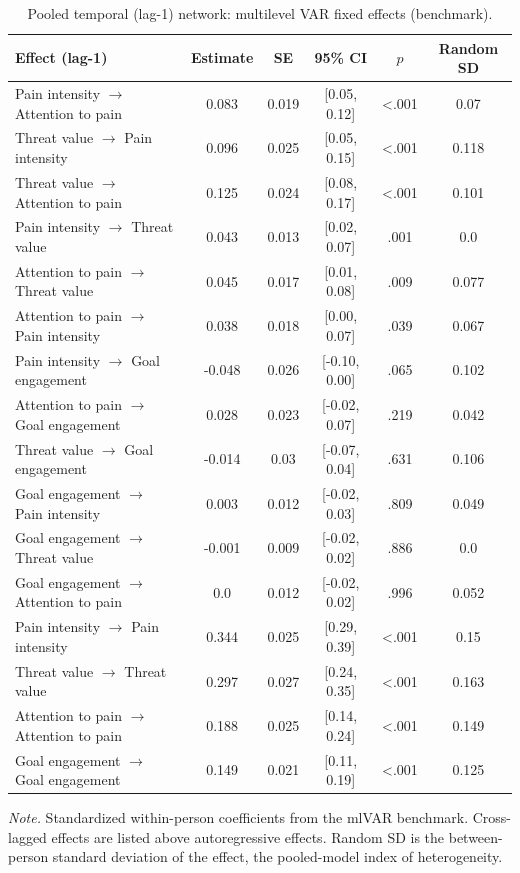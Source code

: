 \begin{table}[!htbp]
\raggedright
\caption{Pooled temporal (lag-1) network: multilevel VAR fixed effects (benchmark).}
\label{tab:temporal}
\footnotesize
\begingroup
\setlength{\tabcolsep}{4pt}
\renewcommand{\arraystretch}{1.08}
\noindent
\begin{tabular*}{\textwidth}{@{\extracolsep{\fill}}lccccc@{}}
\toprule
Effect (lag-1) & Estimate & SE & 95\% CI & $p$ & Random SD \\
\midrule
Pain intensity $\rightarrow$ Attention to pain & 0.083 & 0.019 & [0.05, 0.12] & <.001 & 0.07 \\
Threat value $\rightarrow$ Pain intensity & 0.096 & 0.025 & [0.05, 0.15] & <.001 & 0.118 \\
Threat value $\rightarrow$ Attention to pain & 0.125 & 0.024 & [0.08, 0.17] & <.001 & 0.101 \\
Pain intensity $\rightarrow$ Threat value & 0.043 & 0.013 & [0.02, 0.07] & .001 & 0.0 \\
Attention to pain $\rightarrow$ Threat value & 0.045 & 0.017 & [0.01, 0.08] & .009 & 0.077 \\
Attention to pain $\rightarrow$ Pain intensity & 0.038 & 0.018 & [0.00, 0.07] & .039 & 0.067 \\
Pain intensity $\rightarrow$ Goal engagement & -0.048 & 0.026 & [-0.10, 0.00] & .065 & 0.102 \\
Attention to pain $\rightarrow$ Goal engagement & 0.028 & 0.023 & [-0.02, 0.07] & .219 & 0.042 \\
Threat value $\rightarrow$ Goal engagement & -0.014 & 0.03 & [-0.07, 0.04] & .631 & 0.106 \\
Goal engagement $\rightarrow$ Pain intensity & 0.003 & 0.012 & [-0.02, 0.03] & .809 & 0.049 \\
Goal engagement $\rightarrow$ Threat value & -0.001 & 0.009 & [-0.02, 0.02] & .886 & 0.0 \\
Goal engagement $\rightarrow$ Attention to pain & 0.0 & 0.012 & [-0.02, 0.02] & .996 & 0.052 \\
Pain intensity $\rightarrow$ Pain intensity & 0.344 & 0.025 & [0.29, 0.39] & <.001 & 0.15 \\
Threat value $\rightarrow$ Threat value & 0.297 & 0.027 & [0.24, 0.35] & <.001 & 0.163 \\
Attention to pain $\rightarrow$ Attention to pain & 0.188 & 0.025 & [0.14, 0.24] & <.001 & 0.149 \\
Goal engagement $\rightarrow$ Goal engagement & 0.149 & 0.021 & [0.11, 0.19] & <.001 & 0.125 \\
\bottomrule
\end{tabular*}
\par\vspace{3pt}\noindent\parbox{\textwidth}{\footnotesize\textit{Note.} Standardized within-person coefficients from the mlVAR benchmark. Cross-lagged effects are listed above autoregressive effects. Random SD is the between-person standard deviation of the effect, the pooled-model index of heterogeneity.}
\endgroup
\end{table}
